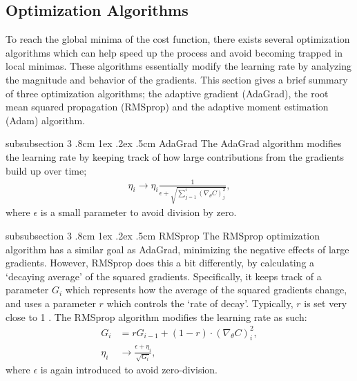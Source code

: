 \documentclass[%
reprint,s
amsmath,amssymb,
aps,
]{revtex4-2}
\makeatletter
\renewcommand{\subsubsection}{%
	\@startsection
	{subsubsection}%
	{3}%
	{\z@}%
	{.8cm \@plus1ex \@minus .2ex}%
	{.5cm}%
	{\normalfont\small\centering}%
}
\makeatother
\begin{document}
\subsection{Optimization Algorithms} \label{sec:optimization_algorithms}
To reach the global minima of the cost function, there exists several optimization algorithms which can help speed up the process and avoid becoming trapped in local minimas. These algorithms essentially modify the learning rate by analyzing the magnitude and behavior of the gradients. This section gives a brief summary of three optimization algorithms; the adaptive gradient (AdaGrad), the root mean squared propagation (RMSprop) and the adaptive moment estimation (Adam) algorithm. 


\subsubsection{AdaGrad}
The AdaGrad algorithm modifies the learning rate by keeping track of how large contributions from the gradients build up over time;
\begin{align}
	\eta_i \rightarrow \eta_i \frac{1}{\epsilon + \sqrt{\sum_{j=1}^{i}(\nabla_{\theta}C)_{j}^{2}}},
\end{align}
where \(\epsilon\) is a small parameter to avoid division by zero.

\subsubsection{RMSprop}
The RMSprop optimization algorithm has a similar goal as AdaGrad, minimizing the negative effects of large gradients. However, RMSprop does this a bit differently, by calculating a `decaying average' of the squared gradients. Specifically, it keeps track of a parameter \(G_i\) which represents how the average of the squared gradients change, and uses a parameter \(r\) which controls the `rate of decay'. Typically, \(r\) is set very close to 1 \cite{fys-stk}. The RMSprop algorithm modifies the learning rate as such:
\begin{align}
	G_i &= r G_{i-1} + (1 - r) \cdot (\nabla_{\theta}C)_{i}^{2}, \\
	\eta_i &\rightarrow \frac{\epsilon + \eta_i}{\sqrt{G_i}},
\end{align}
where \(\epsilon\) is again introduced to avoid zero-division.
\end{document}
